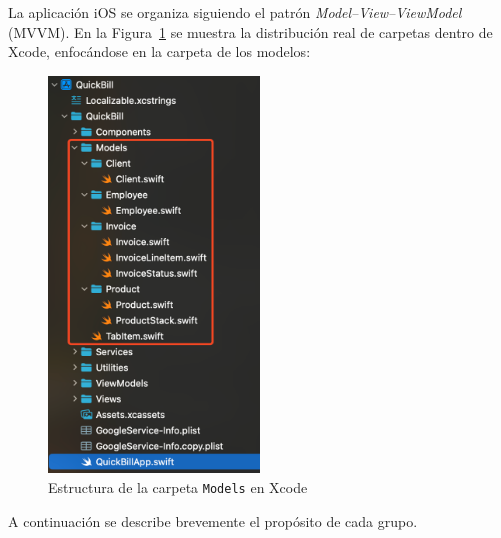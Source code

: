 \begin{large}

La aplicación iOS se organiza siguiendo el patrón \textit{Model–View–ViewModel} (MVVM). En la Figura~\ref{fig:models_folder} se muestra la distribución real de carpetas dentro de Xcode, enfocándose en la carpeta de los modelos:

\begin{figure}[H]
\centering
\includegraphics[width=0.5\textwidth]{Ilustraciones/ios_models_folder.png}
\caption{Estructura de la carpeta \texttt{Models} en Xcode}
\label{fig:models_folder}
\end{figure}

A continuación se describe brevemente el propósito de cada grupo.


\end{large}
